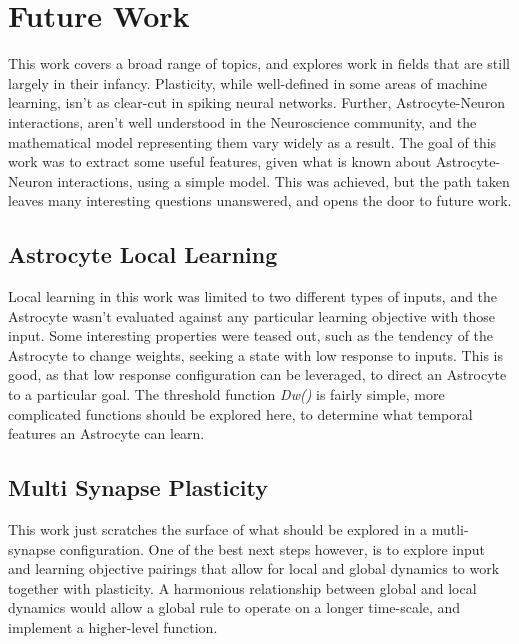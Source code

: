 %

\chapter{Future Work} \label{chapter:future-work}
This work covers a broad range of topics, and explores work in fields that are
still largely in their infancy. Plasticity, while well-defined in some areas of
machine learning, isn't as clear-cut in spiking neural networks. Further,
Astrocyte-Neuron interactions, aren't well understood in the Neuroscience
community, and the mathematical model representing them vary widely as a
result. The goal of this work was to extract some useful features, given what is
known about Astrocyte-Neuron interactions, using a simple model. This was
achieved, but the path taken leaves many interesting questions unanswered, and
opens the door to future work.

\section{Astrocyte Local Learning}
Local learning in this work was limited to two different types of inputs, and
the Astrocyte wasn't evaluated against any particular learning objective with
those input. Some interesting properties were teased out, such as the tendency of
the Astrocyte to change weights, seeking a state with low \ca response to
inputs. This is good, as that low \ca response configuration can be leveraged,
to direct an Astrocyte to a particular goal. The threshold function
\emph{Dw(\ca)} is fairly simple, more complicated functions should be explored
here, to determine what temporal features an Astrocyte can learn.

\section{Multi Synapse Plasticity}
This work just scratches the surface of what should be explored in a
mutli-synapse configuration. One of the best next steps however, is to explore
input and learning objective pairings that allow for local and global dynamics
to work together with plasticity. A harmonious relationship between global and
local dynamics would allow a global rule to operate on a longer time-scale, and
implement a higher-level function.


